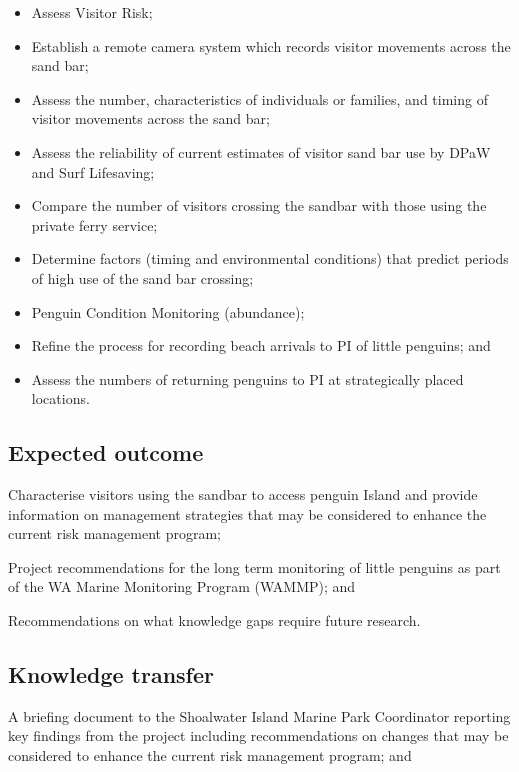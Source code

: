 \documentclass[version=last,
    paper=a4,                               %
    10pt,                                   %
    dvipsnames,
    oneside,                              %
    headings=openany,                       %
    open=any,
    BCOR=7mm,                               %
    DIV=15,     %
]{scrbook}
\begin{document}
\begin{itemize}
\itemsep1pt\parskip0pt
\item
  Assess Visitor Risk;
\item
  Establish a remote camera system which records visitor movements
  across the sand bar;
\item
  Assess the number, characteristics of individuals or families, and
  timing of visitor movements across the sand bar;
\item
  Assess the reliability of current estimates of visitor sand bar use by
  DPaW and Surf Lifesaving;
\item
  Compare the number of visitors crossing the sandbar with those using
  the private ferry service;
\item
  Determine factors (timing and environmental conditions) that predict
  periods of high use of the sand bar crossing;
\item
  Penguin Condition Monitoring (abundance);
\item
  Refine the process for recording beach arrivals to PI of little
  penguins; and
\item
  Assess the numbers of returning penguins to PI at strategically placed
  locations.
\end{itemize}




\subsection*{Expected outcome}

Characterise visitors using the sandbar to access penguin Island and
provide information on management strategies that may be considered to
enhance the current risk management program;

Project recommendations for the long term monitoring of little penguins
as part of the WA Marine Monitoring Program (WAMMP); and

Recommendations on what knowledge gaps require future research.




\subsection*{Knowledge transfer}

A briefing document to the Shoalwater Island Marine Park Coordinator
reporting key findings from the project including recommendations on
changes that may be considered to enhance the current risk management
program; and
\end{document}

